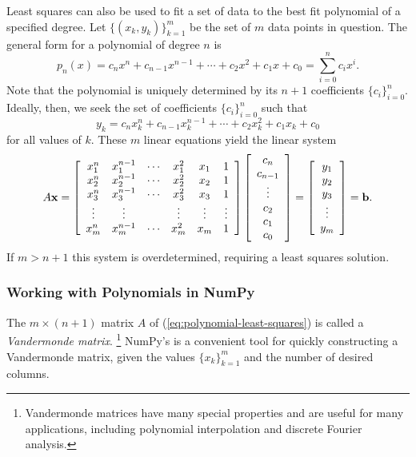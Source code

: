 Least squares can also be used to fit a set of data to the best fit polynomial of a specified degree.
Let $\{(x_k, y_k)\}_{k=1}^m$ be the set of $m$ data points in question.
The general form for a polynomial of degree $n$ is
\[
p_n(x) = c_n x^n + c_{n-1} x^{n-1} + \cdots + c_2 x^2 + c_1 x + c_0 = \sum_{i=0}^n c_i x^i.
\]
Note that the polynomial is uniquely determined by its $n+1$ coefficients $\{c_i\}_{i=0}^n$.
Ideally, then, we seek the set of coefficients $\{c_i\}_{i=0}^n$ such that
\[
y_k = c_n x_k^n + c_{n-1} x_k^{n-1} + \cdots + c_2 x_k^2 + c_1 x_k + c_0
\]
for all values of $k$.
These $m$ linear equations yield the linear system
\begin{equation}
A\mathbf{x} =
\left[\begin{array}{cccccc}
x_1^n & x_1^{n-1} & \cdots & x_1^2 & x_1 & 1 \\
x_2^n & x_2^{n-1} & \cdots & x_2^2 & x_2 & 1 \\
x_3^n & x_3^{n-1} & \cdots & x_3^2 & x_3 & 1 \\
\vdots & \vdots & & \vdots & \vdots & \vdots \\
x_m^n & x_m^{n-1} & \cdots & x_m^2 & x_m & 1 \\
\end{array}\right]
\left[\begin{array}{c}
c_n \\ c_{n-1} \\ \vdots \\ c_2 \\ c_1 \\ c_0
\end{array}\right]
=
\left[\begin{array}{c} y_1 \\ y_2 \\ y_3 \\ \vdots \\ y_m \end{array}\right]
= \mathbf{b}.
\label{eq:polynomial-least-squares}
\end{equation}
%
If $m > n+1$ this system is overdetermined, requiring a least squares solution.

\subsubsection*{Working with Polynomials in NumPy} %

The $m \times (n+1)$ matrix $A$ of (\ref{eq:polynomial-least-squares}) is called a \emph{Vandermonde matrix}.%
\footnote{Vandermonde matrices have many special properties and are useful for many applications, including polynomial interpolation and discrete Fourier analysis.}
NumPy's  is a convenient tool for quickly constructing a Vandermonde matrix, given the values $\{x_k\}_{k=1}^m$ and the number of desired columns.

